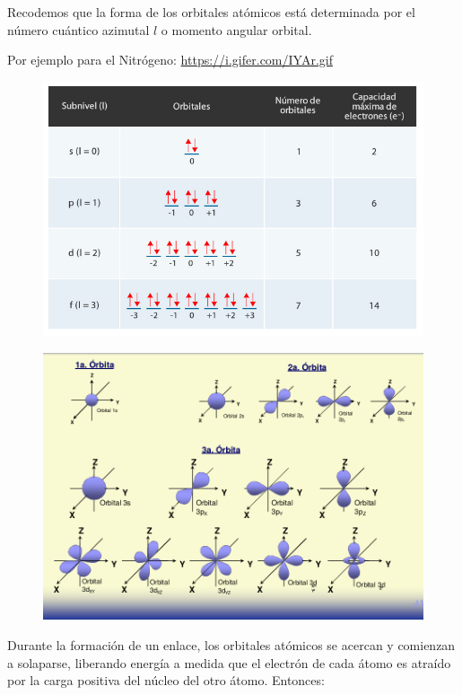 \documentclass{article}
\begin{document}
Recodemos que la forma de los orbitales atómicos está determinada por el número cuántico azimutal $l$ o momento angular orbital.

Por ejemplo para el Nitrógeno: \href{url}{https://i.gifer.com/IYAr.gif}

\begin{figure}[h]
\centering
\includegraphics[width=1\textwidth]{numeros_cuanticos_5.jpg}
\caption{}
\end{figure}

\begin{figure}[h]
\centering
\includegraphics[width=1\textwidth]{orbitales.png}
\caption{}
\end{figure}

Durante la formación de un enlace, los orbitales atómicos se acercan y comienzan a solaparse, liberando energía a medida que el electrón de cada átomo es atraído por la carga positiva del núcleo del otro átomo. Entonces:
\end{document}
